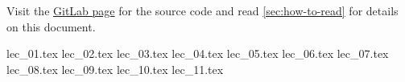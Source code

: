 \documentclass[10pt,english,a4paper, fancyfoot, git]{mkessler-script}
\author{Maximilian Keßler}
\begin{document}
\maketitle
\vfill
\doclicenseThis
Visit the
\href{https://gitlab.com/latexci/lecture-notes-bonn/topology-2}{GitLab page}
for the source code and read
\autoref{sec:how-to-read}
for details on this document.

\cleardoublepage
\tableofcontents

\cleardoublepage
\listoflecture

\cleardoublepage

    {lec_01.tex}
    {lec_02.tex}
    {lec_03.tex}
    {lec_04.tex}
    {lec_05.tex}
    {lec_06.tex}
    {lec_07.tex}
    {lec_08.tex}
    {lec_09.tex}
    {lec_10.tex}
    {lec_11.tex}

\appendix

\cleardoublepage


\cleardoublepage


\cleardoublepage


\cleardoublepage


\cleardoublepage
\printbibliography

\printvocabindex
\end{document}
